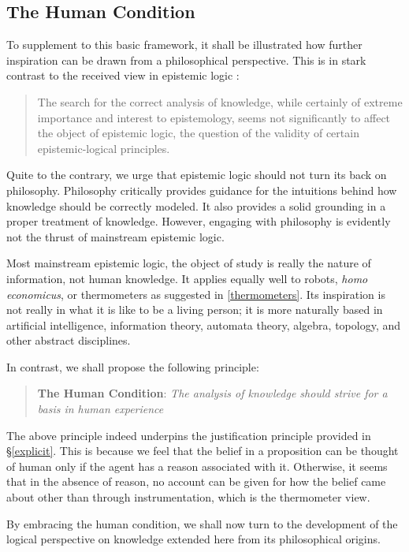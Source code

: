 \documentclass[11pt]{article}
\numberwithin{equation}{subsection}
\begin{document}
\subsection{The Human Condition}\label{Human-Condition}
To supplement to this basic framework, it shall be illustrated how
further inspiration can be drawn from a philosophical
perspective.  This is in stark contrast to
the received view in epistemic logic
\citep[pg. 34]{lenzen_recent_1978}:
\begin{quote}
The search for the correct analysis of knowledge, while certainly of
extreme importance and interest to epistemology, seems not
significantly to affect the object of epistemic logic, the question of
the validity of certain epistemic-logical principles.
\end{quote}
Quite to the contrary, we urge that epistemic logic should not turn
its back on philosophy. Philosophy critically provides guidance for
the intuitions behind how knowledge should be correctly modeled.  It
also provides a solid grounding in a proper treatment of knowledge.
However, engaging with philosophy is evidently not the thrust of
mainstream epistemic logic.

Most mainstream epistemic logic, the object of study is really the
nature of information, not human knowledge.  It applies equally well
to robots, \emph{homo economicus}, or thermometers as suggested in
\ref{thermometers}.  Its inspiration is not really in what it is like
to be a living person; it is more naturally based in artificial
intelligence, information theory, automata theory, algebra, topology,
and other abstract disciplines.

In contrast, we shall propose the following principle:
\begin{quote}
 \textbf{The Human Condition}: \emph{The analysis of knowledge should strive for a basis in human experience}
\end{quote}
The above principle indeed underpins the justification principle
provided in \S\ref{explicit}. This is because we feel that the belief
in a proposition can be thought of human only if the agent has a
reason associated with it.  Otherwise, it seems that in the absence of
reason, no account can be given for how the belief came about other
than through instrumentation, which is the thermometer view.

By embracing the human condition, we shall now turn to the development
of the logical perspective on knowledge extended here from its philosophical origins.
\end{document}
